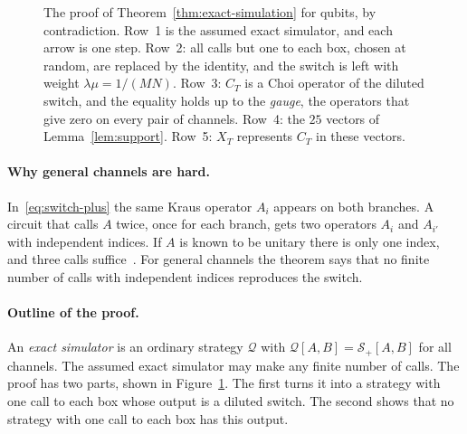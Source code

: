 \documentclass[11pt,letterpaper]{article}
\theoremstyle{definition}\newtheorem{definition}[theorem]{Definition}
\newcommand{\SW}{\mathcal S}
\newcommand{\QC}{\mathcal Q}
\newcommand{\reffig}[1]{Figure~\ref{#1}}
\begin{document}
\begin{figure}[t]
\caption{The proof of Theorem~\ref{thm:exact-simulation} for qubits,
by contradiction. Row~1 is the assumed exact simulator, and
each arrow is one step. Row~2: all calls but one to each box, chosen at
random, are replaced by the identity, and the switch is left with
weight $\lambda\mu=1/(MN)$. Row~3: $C_T$ is a Choi operator of the
diluted switch, and the equality holds up to the \emph{gauge}, the
operators that give zero on every pair of channels. Row~4: the $25$
vectors of Lemma~\ref{lem:support}. Row~5: $X_T$ represents $C_T$ in
these vectors.}
\label{fig:exact}
\end{figure}

\paragraph{Why general channels are hard.}
In~\eqref{eq:switch-plus} the same Kraus operator $A_i$ appears on both
branches. A circuit that calls $A$ twice, once for each branch, gets
two operators $A_i$ and $A_{i'}$ with independent indices. If $A$
is known to be unitary there is only one index, and three calls
suffice~\cite[Theorem~1]{bavaresco2025}. For general channels the theorem
says that no finite number of calls with independent indices
reproduces the switch.

\paragraph{Outline of the proof.}
An \emph{exact simulator} is an
ordinary strategy $\QC$ with $\QC[A,B]=\SW_+[A,B]$ for all channels.
The assumed exact simulator may make any finite number of calls. The
proof has two parts, shown in \reffig{fig:exact}. The
first turns it into a strategy with one call to each
box whose output is a diluted switch. The second shows that no
strategy with one call to each box has this output.
\end{document}
